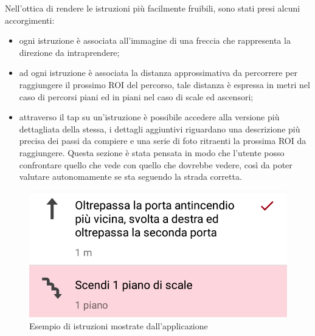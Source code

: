 \documentclass[../Sperimentazione.tex]{subfiles}
\begin{document}
			Nell'ottica di rendere le istruzioni più facilmente fruibili, sono stati presi alcuni accorgimenti:
			\begin{itemize}
				\item ogni istruzione è associata all'immagine di una freccia che rappresenta la direzione da intraprendere;
				\item ad ogni istruzione è associata la distanza approssimativa da percorrere per raggiungere il prossimo ROI del percorso, tale distanza è espressa in metri nel caso di percorsi piani ed in piani nel caso di scale ed ascensori;
				\item attraverso il tap su un'istruzione è possibile accedere alla versione più dettagliata della stessa, i dettagli aggiuntivi riguardano una descrizione più precisa dei passi da compiere e una serie di foto ritraenti la prossima ROI da raggiungere. Questa sezione è stata pensata in modo che l'utente posso confrontare quello che vede con quello che dovrebbe vedere, così da poter valutare autonomamente se sta seguendo la strada corretta.
			\end{itemize}
			
			\begin{figure} [h]
				\centering
				\includegraphics[scale=0.25]{img/list_instruction}
				\caption{Esempio di istruzioni mostrate dall'applicazione}
				\label{fig:ListInstruction}
			\end{figure}
\end{document}
